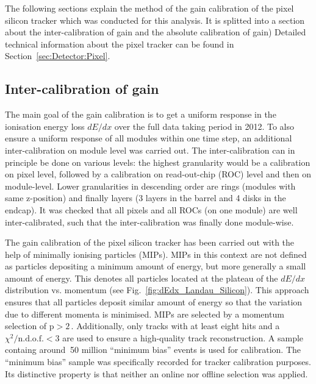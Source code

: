 The following sections explain the method of the gain calibration of the pixel silicon tracker which was conducted for this analysis. 
It is splitted into a section about the inter-calibration of gain and the absolute calibration of gain) 
Detailed technical information about the pixel tracker can be found in Section~\ref{sec:Detector:Pixel}.


\subsection*{Inter-calibration of gain}
The main goal of the gain calibration is to get a uniform response in the ionisation energy loss $dE/dx$ over the full data taking period in 2012.
To also ensure a uniform response of all modules within one time step, an additional inter-calibration on module level was carried out.
The inter-calibration can in principle be done on various levels: the highest granularity would be a calibration on pixel level, followed by a calibration on read-out-chip (ROC) level and then on module-level.
Lower granularities in descending order are rings (modules with same z-position) and finally layers (3 layers in the barrel and 4 disks in the endcap). 
It was checked that all pixels and all ROCs (on one module) are well inter-calibrated, such that the inter-calibration was finally done module-wise.

The gain calibration of the pixel silicon tracker has been carried out with the help of minimally ionising particles (MIPs).
MIPs in this context are not defined as particles depositing a minimum amount of energy, but more generally a small amount of energy.
This denotes all particles located at the plateau of the $dE/dx$ distribution vs. momentum (see Fig.~\ref{fig:dEdx_Landau_Silicon}).
This approach ensures that all particles deposit similar amount of energy so that the variation due to different momenta is minimised.
MIPs are selected by a momentum selection of $\text{p}>2\,$\gev.
Additionally, only tracks with at least eight hits and a $\chi^2/\text{n.d.o.f.}<3$ are used to ensure a high-quality track reconstruction.
A sample containg around $~$50 million ``minimum bias'' events is used for calibration.
The ``minimum bias'' sample was specifically recorded for tracker calibration purposes.
Its distinctive property is that neither an online nor offline selection was applied.


